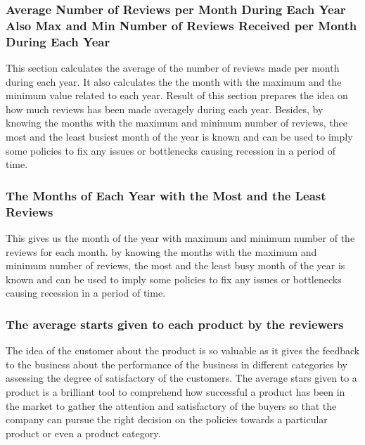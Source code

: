 \subsubsection{Average Number of Reviews per Month During Each Year Also Max and Min Number of Reviews Received per Month During Each Year}
This section calculates the average of the number of reviews made per month during each year. It also calculates the the month with the maximum and the minimum value related to each year. Result of this section prepares the idea on how much reviews has been made averagely during each year. Besides, by knowing the months with the maximum and minimum number of reviews, thee most and the least busiest month of the year is known and can be used to imply some policies to fix any issues or bottlenecks causing recession in a period of time.

\subsubsection{The Months of Each Year with the Most and the Least Reviews}
This gives us the month of the year with maximum and minimum number of the reviews for each month. by knowing the months with the maximum and minimum number of reviews, the most and the least busy month of the year is known and can be used to imply some policies to fix any issues or bottlenecks causing recession in a period of time.
\subsubsection{The average starts given to each product by the reviewers}
The idea of the customer about the product is so valuable as it gives the feedback to the business about the performance of the business in different categories by assessing the degree of satisfactory of the customers. The average stars given to a product is a brilliant tool to comprehend how successful a product has been in the market to gather the attention and satisfactory of the buyers so that the company can pursue the right decision on the policies towards a particular product or even a product category. 

